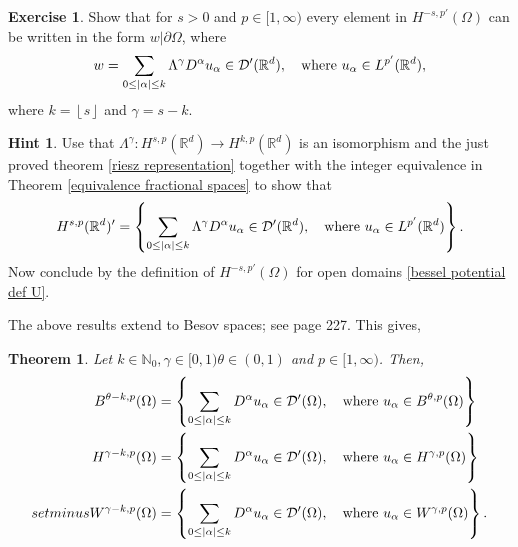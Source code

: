 \documentclass[
    a4paper,
    DIV=14,
    abstract=true,
    numbers=noenddot
]
{scrartcl}
\newtheorem{theorem}{Theorem}[section]
\theoremstyle{definition}
\newtheorem{exercise}{Exercise}
\newtheorem*{hint}{Hint}
\newcommand{\set}[1]{\left\{#1\right\}}
\newcommand\restr[2]{\left.#1\right|{#2}}
\newcommand{\N}{\mathbb{N}}
\newcommand{\R}{\mathbb{R}}
\newcommand{\Dd}{\mathcal{D}}
\begin{document}
\begin{exercise}
    Show that for $s>0$ and $p \in [1,\infty)$ every element in $H^{-s,p'}(\Omega )$ can be written in the form $\restr{w}{\partial \Omega }$, where
    \begin{align*}
        w=\sum_{0\leq\abs{\alpha}\leq k} \Lambda^{\gamma } D^\alpha u_\alpha\in \Dd'(\R^d ),\quad \text{where }    u_\alpha \in L^{p'}(\R^d ),
    \end{align*}
    where $k =\left\lfloor s \right\rfloor$ and $\gamma =s-k$.
\end{exercise}
\begin{hint}
    Use that $\Lambda ^{\gamma }: H^{s,p}(\R^d) \to H^{k ,p}(\R^d)$ is an isomorphism and the just proved theorem \ref{riesz representation} together with the integer equivalence in Theorem \ref{equivalence fractional spaces} to show that
    \begin{align*}
        H^{s,p}(\R^d)' = \set{ \sum_{0\leq\abs{\alpha}\leq k} \Lambda^{\gamma } D^\alpha u_\alpha\in \Dd'(\R^d ),\quad \text{where }    u_\alpha \in L^{p'}(\R^d )}.
    \end{align*}
    Now conclude by the definition of $H^{-s,p'}(\Omega )$ for open domains \ref{bessel potential def U}.
\end{hint}
The above results extend to Besov spaces; see \cite{agranovich2015sobolev} page 227. This gives,
\begin{theorem}
    Let  $k \in \N_0, \gamma \in [0,1) \theta \in (0,1)$ and $p \in [1,\infty)$. Then,
    \begin{align*}
        B^{\theta  -k,p}(\Omega ) & = \set{ \sum_{0\leq\abs{\alpha}\leq k} D^\alpha u_\alpha\in \Dd'(\Omega ),\quad \text{where }    u_\alpha \in B^{\theta  ,p}(\Omega )} \\
        H^{\gamma -k,p}(\Omega )  & = \set{ \sum_{0\leq\abs{\alpha}\leq k} D^\alpha u_\alpha\in \Dd'(\Omega ),\quad \text{where }    u_\alpha \in H^{\gamma ,p}(\Omega )}  \\setminus	W^{\gamma -k,p}(\Omega )  & = \set{ \sum_{0\leq\abs{\alpha}\leq k} D^\alpha u_\alpha\in \Dd'(\Omega ),\quad \text{where }    u_\alpha \in W^{\gamma ,p}(\Omega )}.
    \end{align*}
\end{theorem}
\end{document}
